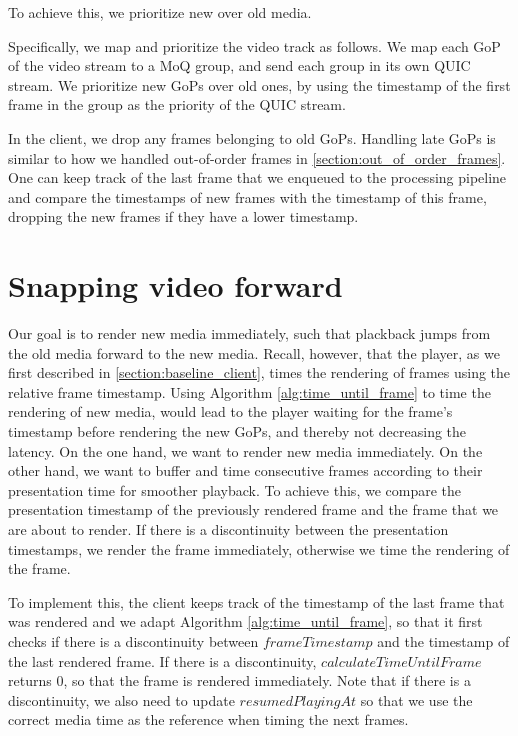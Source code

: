 To achieve this, we prioritize new over old media. 

Specifically, we map and prioritize the video track as follows. We map each GoP of the video stream to a MoQ group, and send each group in its own QUIC stream. We prioritize new GoPs over old ones, by using the timestamp of the first frame in the group as the priority of the QUIC stream.

In the client, we drop any frames belonging to old GoPs. Handling late GoPs is similar to how we handled out-of-order frames in \autoref{section:out_of_order_frames}. One can keep track of the last frame that we enqueued to the processing pipeline and compare the timestamps of new frames with the timestamp of this frame, dropping the new frames if they have a lower timestamp. %

\section{Snapping video forward}\label{section:snapping_video_forward}
Our goal is to render new media immediately, such that plackback jumps from the old media forward to the new media. Recall, however, that the player, as we first described in \autoref{section:baseline_client}, times the rendering of frames using the relative frame timestamp. Using Algorithm \ref{alg:time_until_frame} to time the rendering of new media, would lead to the player waiting for the frame's timestamp before rendering the new GoPs, and thereby not decreasing the latency. On the one hand, we want to render new media immediately. On the other hand, we want to buffer and time consecutive frames according to their presentation time for smoother playback. To achieve this, we compare the presentation timestamp of the previously rendered frame and the frame that we are about to render. If there is a discontinuity between the presentation timestamps, we render the frame immediately, otherwise we time the rendering of the frame.

To implement this, the client keeps track of the timestamp of the last frame that was rendered and we adapt Algorithm \ref{alg:time_until_frame}, so that it first checks if there is a discontinuity between $frameTimestamp$ and the timestamp of the last rendered frame. If there is a discontinuity, $calculateTimeUntilFrame$ returns 0, so that the frame is rendered immediately. Note that if there is a discontinuity, we also need to update $resumedPlayingAt$ so that we use the correct media time as the reference when timing the next frames.

